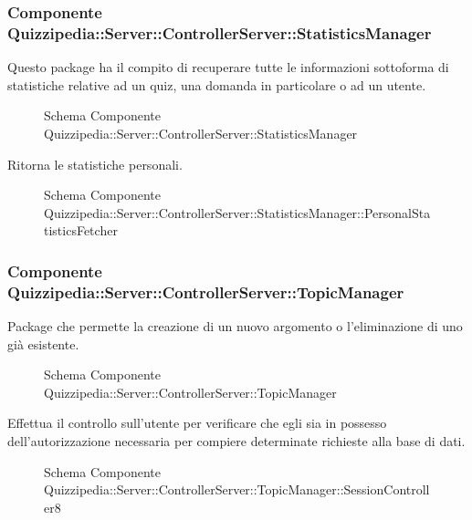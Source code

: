 \subsubsection{Componente Quizzipedia::Server::ControllerServer::StatisticsManager}
Questo package ha il compito di recuperare tutte le informazioni sottoforma di statistiche relative ad un quiz, una domanda in particolare o ad un utente.
\begin{figure}[H]
\centering
\noindent{}
\caption{Schema Componente Quizzipedia::Server::ControllerServer::StatisticsManager}
\end{figure}
Ritorna le statistiche personali.
\begin{figure}[H]
\centering
\noindent{}
\caption{Schema Componente Quizzipedia::Server::ControllerServer::StatisticsManager::PersonalStatisticsFetcher}
\end{figure}
\subsubsection{Componente Quizzipedia::Server::ControllerServer::TopicManager}
Package che permette la creazione di un nuovo argomento o l'eliminazione di uno già esistente.
\begin{figure}[H]
\centering
\noindent{}
\caption{Schema Componente Quizzipedia::Server::ControllerServer::TopicManager}
\end{figure}
Effettua il controllo sull'utente per verificare che egli sia in possesso dell'autorizzazione necessaria per compiere determinate richieste alla base di dati.
\begin{figure}[H]
\centering
\noindent{}
\caption{Schema Componente Quizzipedia::Server::ControllerServer::TopicManager::SessionController8}
\end{figure}
